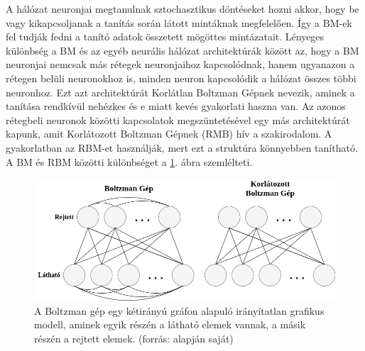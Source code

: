 

A hálózat neuronjai megtanulnak sztochasztikus döntéseket hozni akkor, hogy be vagy kikapcsoljanak a tanítás során látott mintáknak megfelelően. Így a BM-ek fel tudják fedni a tanító adatok összetett mögöttes mintázatait. Lényeges különbség a BM és az egyéb neurális hálózat architektúrák között az, hogy a BM neuronjai nemcsak más rétegek neuronjaihoz kapcsolódnak, hanem ugyanazon a rétegen belüli neuronokhoz is, minden neuron kapcsolódik a hálózat összes többi neuronhoz. Ezt azt architektúrát Korlátlan Boltzman Gépnek nevezik, aminek a tanítása rendkívül nehézkes és e miatt kevés gyakorlati haszna van. Az azonos rétegbeli neuronok közötti kapcsolatok megszüntetésével egy más architektúrát kapunk, amit Korlátozott Boltzman Gépnek (RMB) hív a szakirodalom. A gyakorlatban az RBM-et használják, mert ezt a struktúra könnyebben tanítható. A BM és RBM közötti különbséget a \ref{fig:bm}. ábra szemlélteti.

\begin{figure}[ht]
	\centering
	\includegraphics[width=1\columnwidth]{figures/BM_vs_RBM.png}
	\caption{A Boltzman gép egy kétirányú gráfon alapuló irányítatlan grafikus modell, aminek egyik részén a látható elemek vannak, a másik részén a rejtett elemek. (forrás: \cite{fig:BM_vs_RBM} alapján saját)}
	\label{fig:bm}
\end{figure}

